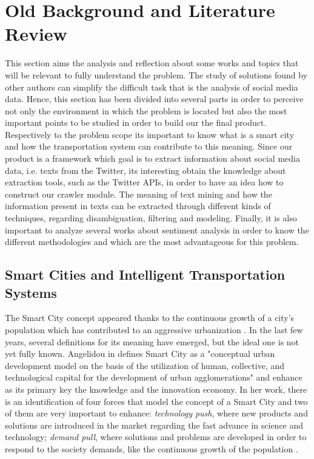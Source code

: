 \chapter{Old Background and Literature Review} \label{chap:sota}

\minitoc \mtcskip \noindent

This section aims the analysis and reflection about some works and topics that will be relevant to fully understand the problem. The study of solutions found by other authors can simplify the difficult task that is the analysis of social media data.
Hence, this section has been divided into several parts in order to perceive not only the environment in which the problem is located but also the most important points to be studied in order to build our the final product. Respectively to the problem scope its important to know what is a smart city and how the transportation system can contribute to this meaning. Since our product is a framework which goal is to extract information about social media data, i.e. texts from the Twitter, its interesting obtain the knowledge about extraction tools, such as the Twitter APIs, in order to have an idea how to construct our crawler module. The meaning of text mining and how the information present in texts can be extracted through different kinds of techniques, regarding disambiguation, filtering and modeling. Finally, it is also important to analyze several works about sentiment analysis in order to know the different methodologies and which are the most advantageous for this problem.

\section{Smart Cities and Intelligent Transportation Systems}\label{sec:smartcities}

The Smart City concept appeared thanks to the continuous growth of a city's population which has contributed to an aggressive urbanization \cite{kn:Cecilia2016}. In the last few years, several definitions for its meaning have emerged, but the ideal one is not yet fully known. Angelidou in \cite{kn:Angelidou2015} defines Smart City as a "conceptual urban development model on the basis of the utilization of human, collective, and technological capital for the development of urban agglomerations" and enhance as its primary key the knowledge and the innovation economy. In her work, there is an identification of four forces that model the concept of a Smart City and two of them are very important to enhance: \textit{technology push}, where new products and solutions are introduced in the market regarding the fast advance in science and technology; \textit{demand pull}, where solutions and problems are developed in order to respond to the society demands, like the continuous growth of the population \cite{kn:Angelidou2015}.

